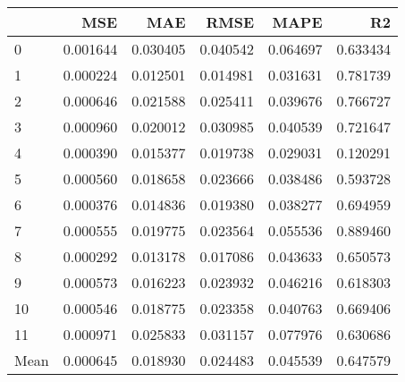 \begin{tabular}{lrrrrr}
\toprule
 & MSE & MAE & RMSE & MAPE & R2 \\
\midrule
0 & 0.001644 & 0.030405 & 0.040542 & 0.064697 & 0.633434 \\
1 & 0.000224 & 0.012501 & 0.014981 & 0.031631 & 0.781739 \\
2 & 0.000646 & 0.021588 & 0.025411 & 0.039676 & 0.766727 \\
3 & 0.000960 & 0.020012 & 0.030985 & 0.040539 & 0.721647 \\
4 & 0.000390 & 0.015377 & 0.019738 & 0.029031 & 0.120291 \\
5 & 0.000560 & 0.018658 & 0.023666 & 0.038486 & 0.593728 \\
6 & 0.000376 & 0.014836 & 0.019380 & 0.038277 & 0.694959 \\
7 & 0.000555 & 0.019775 & 0.023564 & 0.055536 & 0.889460 \\
8 & 0.000292 & 0.013178 & 0.017086 & 0.043633 & 0.650573 \\
9 & 0.000573 & 0.016223 & 0.023932 & 0.046216 & 0.618303 \\
10 & 0.000546 & 0.018775 & 0.023358 & 0.040763 & 0.669406 \\
11 & 0.000971 & 0.025833 & 0.031157 & 0.077976 & 0.630686 \\
Mean & 0.000645 & 0.018930 & 0.024483 & 0.045539 & 0.647579 \\
\bottomrule
\end{tabular}
